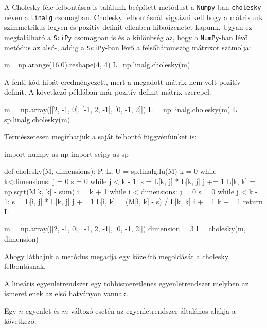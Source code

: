     A Cholesky féle felbontásra is találunk beépített metódust a
\texttt{Numpy}-ban \texttt{cholesky} néven a \texttt{linalg} csomagban.
Cholesky felbontásnál vigyázni kell hogy a mátrixunk szimmetrikus legyen
és pozitív definit ellenben hibaüzenetet kapunk. Ugyan ez megtalálható a
\texttt{SciPy} csomagban is és a különbség az, hogy a \texttt{NumPy}-ban
lévő metódus az alsó-, addig a \texttt{SciPy}-ban lévő a felsőháromszög
mátrixot számolja:
\begin{python}
m =np.arange(16.0).reshape(4, 4)
L=np.linalg.cholesky(m)
\end{python}
    A fenti kód hibát eredményezett, mert a megadott mátrix nem volt pozitív
definit. A következő példában már pozitív definit mátrix szerepel:
\begin{python}
m = np.array([[2, -1, 0], [-1, 2, -1], [0, -1, 2]])
L = np.linalg.cholesky(m)
L = sp.linalg.cholesky(m)
\end{python}
Természetesen megírhatjuk a saját felbontó függvéníünket is:
\begin{python}
import numpy as np
import scipy as sp

def cholesky(M, dimensions):
    P, L, U = sp.linalg.lu(M)
    k = 0
    while k<dimensions:
        j = 0
        s = 0
        while j < k - 1:
            s = L[k, j] * L[k, j]
            j += 1
        L[k, k] = np.sqrt(M[k, k] - sum)
        i = k + 1
        while i < dimensions:
            j = 0
            s = 0
            while j < k - 1:
                s = L[i, j] * L[k, j]
                j += 1
            L[i, k] = (M[i, k] - s) / L[k, k]
            i += 1
        k += 1
    return L

m = np.array([[2, -1, 0], [-1, 2, -1], [0, -1, 2]])
dimension = 3
l = cholesky(m, dimension)
\end{python}
Ahogy láthajuk a metódus megadja egy közelítő megoldását a cholesky
felbontásnak.



    A lineáris egyenletrendszer egy többismeretlenes egyenletrendszer
melyben az ismeretlenek az első hatványon vannak.

    Egy \(n\) egyenlet és \(m\) változó esetén az egyenletrendszer általános
alakja a következő:

